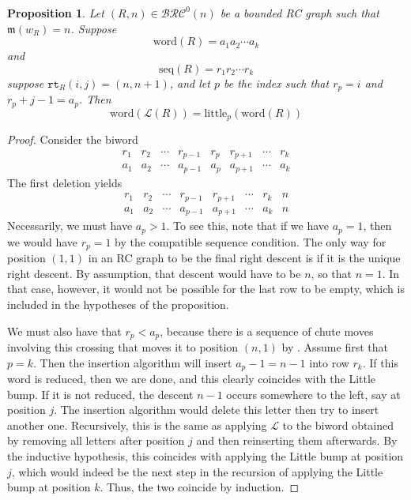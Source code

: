 \documentclass{amsart}
\newtheorem{proposition}[lemma]{Proposition}
\theoremstyle{definition}
\theoremstyle{remark}
\numberwithin{equation}{subsection}
\newcommand{\wof}[1]{w_{#1}}
\newcommand{\rtt}{\mathtt{rt}}
\newcommand{\BRC}{\mathcal{BRC}}
\newcommand{\lmap}{\mathscr{L}}
\newcommand{\ltb}{\mathrm{little}}
\newcommand{\maxd}{\mathfrak{m}}
\begin{document}
\begin{proposition} \label{proposition:little_bump}
  Let $(R, n)\in \BRC^0(n)$ be a bounded RC graph such that $\maxd(\wof{R}) = n$. Suppose 
  $$\mathrm{word}(R) = a_1 a_2 \cdots a_k$$ 
  and 
  $$\mathrm{seq}(R) = r_1 r_2 \cdots r_k$$ 
  suppose $\rtt_R(i,j)=(n,n+1)$, and let $p$ be the index such that $r_p=i$ and $r_p + j - 1 = a_p$. Then
  $$\mathrm{word}(\lmap(R)) = \ltb_{p}(\mathrm{word}(R))$$
\end{proposition}
\begin{proof}
Consider the biword
$$\begin{matrix}
r_1& r_2& \cdots & r_{p-1} & r_p & r_{p+1} & \cdots & r_k\\
a_1& a_2& \cdots & a_{p-1} & a_p & a_{p+1} & \cdots & a_k
\end{matrix}$$
The first deletion yields
$$\begin{matrix}
r_1& r_2& \cdots & r_{p-1} &  r_{p+1} & \cdots & r_k& n\\
a_1& a_2& \cdots & a_{p-1} &  a_{p+1} & \cdots & a_k& n
\end{matrix}$$
Necessarily, we must have $a_p > 1$. To see this, note that if we have $a_p=1$, then we would have $r_p=1$ by the compatible sequence condition. The only way for position $(1,1)$ in an RC graph to be the final right descent is if it is the unique right descent. By assumption, that descent would have to be $n$, so that $n=1$. In that case, however, it would not be possible for the last row to be empty, which is included in the hypotheses of the proposition.

We must also have that $r_p < a_p$, because there is a sequence of chute moves involving this crossing that moves it to position $(n, 1)$ by \cite[Theorem~3.7]{bbrc}. Assume first that $p = k$. Then the insertion algorithm will insert $a_p - 1=n-1$ into row $r_k$. If this word is reduced, then we are done, and this clearly coincides with the Little bump. If it is not reduced, the descent $n-1$ occurs somewhere to the left, say at position $j$. The insertion algorithm would delete this letter then try to insert another one. Recursively, this is the same as applying $\lmap$ to the biword obtained by removing all letters after position $j$ and then reinserting them afterwards. By the inductive hypothesis, this coincides with applying the Little bump at position $j$, which would indeed be the next step in the recursion of applying the Little bump at position $k$. Thus, the two coincide by induction.
\end{proof}
\end{document}
